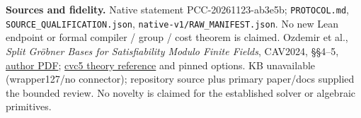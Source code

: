 \documentclass[10pt]{article}
\begin{document}
\textbf{Sources and fidelity.} Native statement PCC-20261123-ab3e5b;
\texttt{PROTOCOL.md}, \texttt{SOURCE\_QUALIFICATION.json},
\texttt{native-v1/RAW\_MANIFEST.json}. No new Lean endpoint or formal compiler /
group / cost theorem is claimed. Ozdemir et al., \emph{Split Gr\"obner Bases for
Satisfiability Modulo Finite Fields}, CAV2024, \S\S4--5,
\href{https://theory.stanford.edu/~barrett/pubs/OPB+24.pdf}{author PDF};
\href{https://cvc5.github.io/docs/cvc5-1.4.2/theories/finite_field.html}{cvc5 theory reference}
and pinned options. KB unavailable (wrapper127/no connector); repository
source plus primary paper/docs supplied the bounded review. No novelty is
claimed for the established solver or algebraic primitives.
\end{document}

